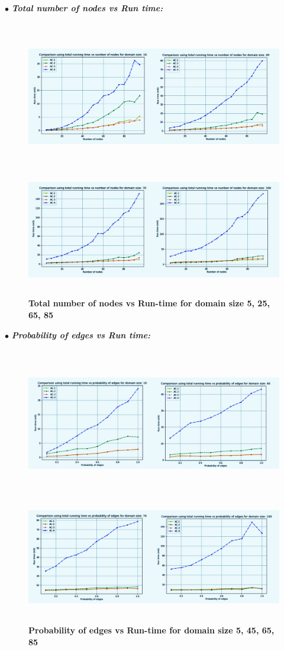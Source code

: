 \documentclass[12pt, english]{article}
\begin{document}
\hspace*{0.5cm}$\bullet$ \textit{\textbf{Total number of nodes vs Run time:}}
\begin{figure}[ht]
		{\includegraphics[width=\textwidth,height=2.6in]{1.jpeg}}
		{\includegraphics[width=\textwidth,height=2in]{2.jpeg}}
		\caption{\textbf{Total number of nodes vs Run-time for domain size 5, 25, 65, 85}}
        \label{fig: 1}
\end{figure}

\hspace*{0.5cm}$\bullet$ \textit{\textbf{Probability of edges vs Run time:}}
\begin{figure}[ht]
		{\includegraphics[width=\textwidth,height=2.6in]{3.jpeg}}
		{\includegraphics[width=\textwidth,height=2in]{4.jpeg}}
		\caption{\textbf{Probability of edges vs Run-time for domain size 5, 45, 65, 85}}
        \label{fig: 2}
\end{figure}
\end{document}
